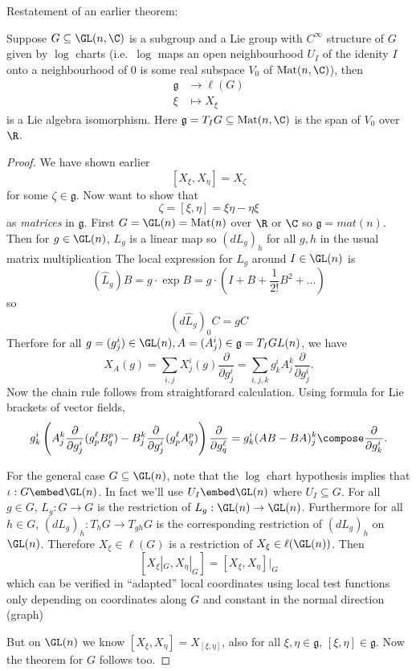 \documentclass[a4paper]{article}
\begin{document}
Restatement of an earlier theorem:
\begin{theorem}
  Suppose \(G \subseteq \GL(n, \C)\) is a subgroup and a Lie group with \(C^\infty\) structure of \(G\) given by \(\log\) charts (i.e.\ \(\log\) maps an open neighbourhood \(U_I\) of the idenity \(I\) onto a neighbourhood of \(0\) is some real subspace \(V_0\) of \(\operatorname{Mat}(n, \C)\)), then
  \begin{align*}
    \mathfrak g &\to \ell(G) \\
    \xi &\mapsto X_\xi
  \end{align*}
  is a Lie algebra isomorphism. Here \(\mathfrak g = T_IG \subseteq \operatorname{Mat}(n, \C)\) is the span of \(V_0\) over \(\R\).
\end{theorem}

\begin{proof}
  We have shown earlier
  \[
    [X_\xi, X_\eta] = X_\zeta
  \]
  for some \(\zeta \in \mathfrak g\). Now want to show that
  \[
    \zeta = [\xi, \eta] = \xi\eta - \eta \xi
  \]
  as \emph{matrices} in \(\mathfrak g\). First \(G = \GL(n) = \operatorname{Mat}(n)\) over \(\R\) or \(\C\) so \(\mathfrak g = mat(n)\). Then for \(g \in \GL(n)\), \(L_g\) is a linear map so \((dL_g)_h\) for all \(g, h\) in the usual matrix multiplication %
  The local expression for \(L_g\) around \(I \in \GL(n)\) is
  \[
    (\hat L_g) B = g \cdot \exp B = g \cdot (I + B + \frac{1}{2!} B^2 + \dots)
  \]
  so
  \[
    (d \hat L_g)_0 C = gC
  \]
  Therfore for all \(g = (g^i_j) \in \GL(n), A = (A^i_j) \in \mathfrak g = T_IGL(n)\), we have
  \[
    X_A(g)
    = \sum_{i, j} X^i_j(g) \frac{\partial  }{\partial g^i_j}
    = \sum_{i, j, k} g^i_k A^k_j \frac{\partial  }{\partial g^i_j}.
  \]
  Now the chain rule follows from straightforard calculation. Using formula for Lie brackets of vector fields,
  \[
    g^i_k \left( A^k_j \frac{\partial  }{\partial g^i_j} (g^\ell_p B^p_q) - B^k_j \frac{\partial  }{\partial g^i_j} (g^\ell_p A^p_q) \right) \frac{\partial  }{\partial g^\ell_q}
    = g^i_k (AB - BA)^k_j \compose \frac{\partial  }{\partial g^i_k}.
  \]

  For the general case \(G \subseteq \GL(n)\), note that the \(\log\) chart hypothesis implies that \(\iota: G \embed \GL(n)\). In fact we'll use \(U_I \embed \GL(n)\) where \(U_I \subseteq G\). For all \(g \in G\), \(L_g: G \to G\) is the restriction of \(L_g: \GL(n) \to \GL(n)\). Furthermore for all \(h \in G\), \((dL_g)_h: T_hG \to T_{gh}G\) is the corresponding restriction of \((dL_g)_h\) on \(\GL(n)\). Therefore \(X_\xi \in \ell(G)\) is a restriction of \(X_\xi \in \ell(\GL(n))\). Then
  \[
    [X_\xi|_G, X_\eta|_G] = [X_\xi, X_\eta]|_G
  \]
  which can be verified in ``adapted'' local coordinates using local test functions only depending on coordinates along \(G\) and constant in the normal direction (graph)

  But on \(\GL(n)\) we know \([X_\xi, X_\eta] = X_{[\xi, \eta]}\), also for all \(\xi, \eta \in \mathfrak g\), \([\xi, \eta] \in \mathfrak g\). Now the theorem for \(G\) follows too.
\end{proof}
\end{document}

